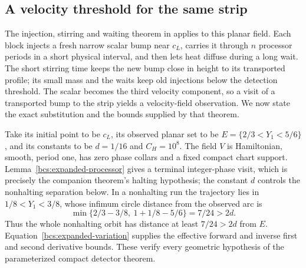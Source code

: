 \subsection{A velocity threshold for the same strip}\label{bcs:expanded-diffusion}
The injection, stirring and waiting theorem in \cite[Theorem~3.1]{velocity2026} applies to this planar field. Each block injects a fresh narrow scalar bump near $c_L$, carries it through $n$ processor periods in a short physical interval, and then lets heat diffuse during a long wait. The short stirring time keeps the new bump close in height to its transported profile; its small mass and the waits keep old injections below the detection threshold. The scalar becomes the third velocity component, so a visit of a transported bump to the strip yields a velocity-field observation. We now state the exact substitution and the bounds supplied by that theorem.

Take its initial point to be $c_L$, its observed planar set to be $E=\{2/3<Y_1<5/6\}$, and its constants to be $d=1/16$ and $C_H=10^8$. The field $V$ is Hamiltonian, smooth, period one, has zero phase collars and a fixed compact chart support. Lemma~\ref{bcs:expanded-processor} gives a terminal integer-phase visit, which is precisely the companion theorem's halting hypothesis; the constant $d$ controls the nonhalting separation below. In a nonhalting run the trajectory lies in $1/8<Y_1<3/8$, whose infimum circle distance from the observed arc is
\[
 \min\{2/3-3/8,\ 1+1/8-5/6\}=7/24>2d.
\]
Thus the whole nonhalting orbit has distance at least $7/24>2d$ from $E$. Equation~\eqref{bcs:expanded-variation} supplies the effective forward and inverse first and second derivative bounds. These verify every geometric hypothesis of the parameterized compact detector theorem.

